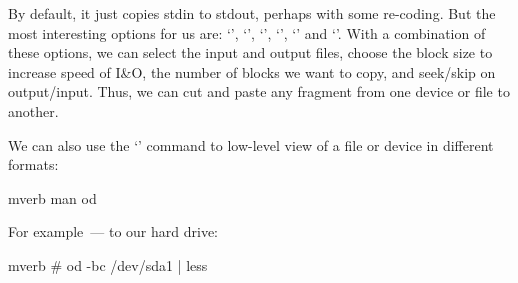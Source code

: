 By default, it just copies stdin to stdout, perhaps with some re-coding.
But the most interesting options for us are: `', `', `',
`', `' and `'. With a combination of these
options, we can select the input and output files, choose the block size
to increase speed of I\&O, the number of blocks we want to copy, and seek/skip
on output/input. Thus, we can cut and paste any fragment from one device or
file to another.

We can also use the `' command to low-level view of a file or device
in different formats:
\begin{code}{mverb}
man od
\end{code}
For example~--- to our hard drive:
\begin{code}{mverb}
# od -bc /dev/sda1 | less
\end{code}

